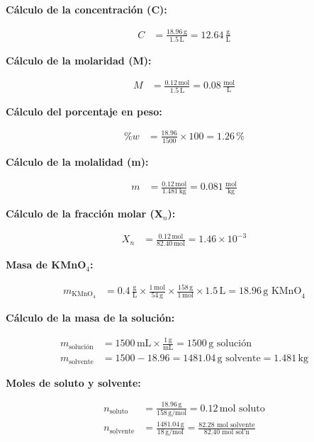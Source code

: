 \documentclass{article}
\begin{document}
\begin{multicols}{2}
\textbf{Cálculo de la concentración (C):}

\begin{align*}
    C &= \frac{18.96 \, \text{g}}{1.5 \, \text{L}} = 12.64 \, \frac{\text{g}}{\text{L}}
\end{align*}

\textbf{Cálculo de la molaridad (M):}

\begin{align*}
    M &= \frac{0.12 \, \text{mol}}{1.5 \, \text{L}} = 0.08 \, \frac{\text{mol}}{\text{L}}
\end{align*}

\textbf{Cálculo del porcentaje en peso:}

\begin{align*}
    \%w &= \frac{18.96}{1500} \times 100 = 1.26 \, \%
\end{align*}

\textbf{Cálculo de la molalidad (m):}

\begin{align*}
    m &= \frac{0.12 \, \text{mol}}{1.481 \, \text{kg}} = 0.081 \, \frac{\text{mol}}{\text{kg}}
\end{align*}

\textbf{Cálculo de la fracción molar (X$_n$):}

\begin{align*}
    X_n &= \frac{0.12 \, \text{mol}}{82.40 \, \text{mol}} = 1.46 \times 10^{-3}
\end{align*}


\textbf{Masa de KMnO$_4$:}

\begin{align*}
    m_{\text{KMnO}_4} &= 0.4 \, \frac{\text{g}}{\text{L}} \times \frac{1 \, \text{mol}}{54 \, \text{g}} \times \frac{158 \, \text{g}}{1 \, \text{mol}} \times 1.5 \, \text{L} = 18.96 \, \text{g KMnO}_4
\end{align*}

\textbf{Cálculo de la masa de la solución:}

\begin{align*}
    m_{\text{solución}} &= 1500 \, \text{mL} \times \frac{1 \, \text{g}}{\text{mL}} = 1500 \, \text{g solución} \\[10pt]
    m_{\text{solvente}} &= 1500 - 18.96 = 1481.04 \, \text{g solvente} = 1.481 \, \text{kg}
\end{align*}

\textbf{Moles de soluto y solvente:}

\begin{align*}
    n_{\text{soluto}} &= \frac{18.96 \, \text{g}}{158 \, \text{g/mol}} = 0.12 \, \text{mol soluto} \\[10pt]
    n_{\text{solvente}} &= \frac{1481.04 \, \text{g}}{18 \, \text{g/mol}} = \frac{82.28\text{ mol solvente}}{82.40\text{ mol sol'n}} \,  \\[10pt]
\end{align*}

\end{multicols} %
\end{document}
